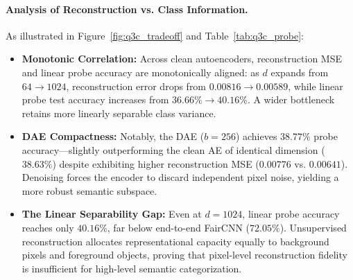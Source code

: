 \paragraph{Analysis of Reconstruction vs. Class Information.}
As illustrated in Figure~\ref{fig:q3c_tradeoff} and Table~\ref{tab:q3c_probe}:
\begin{itemize}
    \item \textbf{Monotonic Correlation:} Across clean autoencoders, reconstruction MSE and linear probe accuracy are monotonically aligned: as $d$ expands from $64 \to 1024$, reconstruction error drops from $0.00816 \to 0.00589$, while linear probe test accuracy increases from $36.66\% \to 40.16\%$. A wider bottleneck retains more linearly separable class variance.
    \item \textbf{DAE Compactness:} Notably, the DAE ($b=256$) achieves $38.77\%$ probe accuracy—slightly outperforming the clean AE of identical dimension ($38.63\%$) despite exhibiting higher reconstruction MSE ($0.00776$ vs. $0.00641$). Denoising forces the encoder to discard independent pixel noise, yielding a more robust semantic subspace.
    \item \textbf{The Linear Separability Gap:} Even at $d=1024$, linear probe accuracy reaches only $40.16\%$, far below end-to-end FairCNN ($72.05\%$). Unsupervised reconstruction allocates representational capacity equally to background pixels and foreground objects, proving that pixel-level reconstruction fidelity is insufficient for high-level semantic categorization.
\end{itemize}
